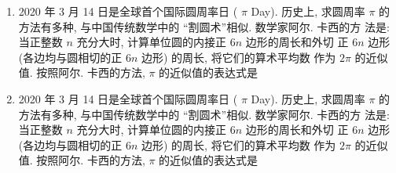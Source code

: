\documentclass{ctexart}
\begin{document}
\begin{enumerate}
  \item 2020 年 3 月 14 日是全球首个国际圆周率日 ( $\pi$ Day). 历史上, 求圆周率 $\pi$ 的方法有多种, 与中国传统数学中的 “割圆术”相似. 数学家阿尔. 卡西的方 法是: 当正整数 $n$ 充分大时, 计算单位圆的内接正 $6 n$ 边形的周长和外切 正 $6 n$ 边形 (各边均与圆相切的正 $6 n$ 边形) 的周长, 将它们的算术平均数 作为 $2 \pi$ 的近似值. 按照阿尔. 卡西的方法, $\pi$ 的近似值的表达式是 \xparen

  \item 2020 年 3 月 14 日是全球首个国际圆周率日 ( $\pi$ Day). 历史上, 求圆周率 $\pi$ 的方法有多种, 与中国传统数学中的 “割圆术”相似. 数学家阿尔. 卡西的方 法是: 当正整数 $n$ 充分大时, 计算单位圆的内接正 $6 n$ 边形的周长和外切 正 $6 n$ 边形 (各边均与圆相切的正 $6 n$ 边形) 的周长, 将它们的算术平均数 作为 $2 \pi$ 的近似值. 按照阿尔. 卡西的方法, $\pi$ 的近似值的表达式是 \xparen

\end{enumerate}
\end{document}
